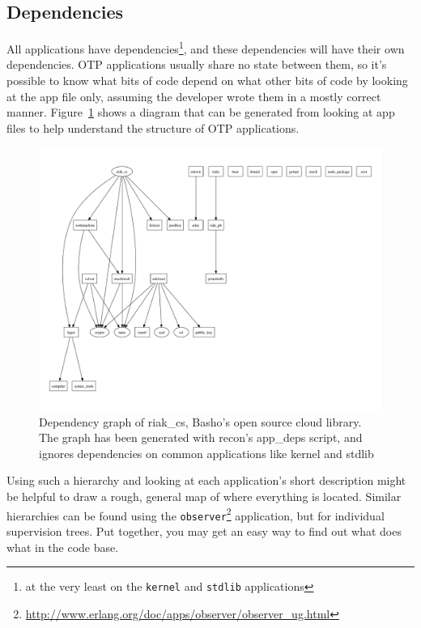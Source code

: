 \documentclass[11pt, oneside]{book}   	%
\newcommand{\module}[1]{\Verb`#1`}
\begin{document}
\subsection{Dependencies}
\label{subsec:dive-dependencies}

All applications have dependencies\footnote{at the very least on the \module{kernel} and \module{stdlib} applications}, and these dependencies will have their own dependencies. OTP applications usually share no state between them, so it's possible to know what bits of code depend on what other bits of code by looking at the app file only, assuming the developer wrote them in a mostly correct manner. Figure~\ref{fig:app-deps} shows a diagram that can be generated from looking at app files to help understand the structure of OTP applications.


\begin{figure}
  \includegraphics{app-deps-riak-cs.pdf}%
  \caption{Dependency graph of riak\_cs, Basho's open source cloud library.
  The graph has been generated with recon's app\_deps script, and ignores dependencies on common applications like kernel and stdlib}%
   \label{fig:app-deps}
\end{figure}

Using such a hierarchy and looking at each application's short description might be helpful to draw a rough, general map of where everything is located. Similar hierarchies can be found using the \module{observer}\footnote{\href{http://www.erlang.org/doc/apps/observer/observer\_ug.html}{http://www.erlang.org/doc/apps/observer/observer\_ug.html}} application, but for individual supervision trees. Put together, you may get an easy way to find out what does what in the code base.
\end{document}

